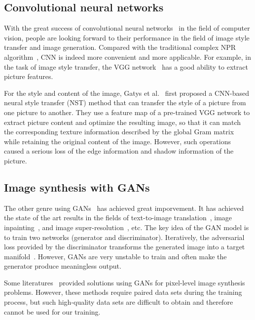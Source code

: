 \documentclass[10pt,twocolumn,letterpaper]{article}
\begin{document}
\subsection{Convolutional neural networks}
With the great success of convolutional neural networks~\cite{krizhevsky2012imagenet, lawrence1997face} in the field of
computer vision, people are looking forward to their performance in the
field of image style transfer and image generation. Compared with the
traditional complex NPR algorithm~\cite{saito1990comprehensible,luque2012cel}, CNN is indeed more convenient and more
applicable. For example, in the task of image style transfer, the VGG
network~\cite{VGG} has a good ability to extract picture features.

For the style and content of the image, Gatys et al.~\cite{NST} first proposed a
CNN-based neural style transfer (NST) method that can transfer the style
of a picture from one picture to another. They use a feature map of a
pre-trained VGG network to extract picture content and optimize the
resulting image, so that it can match the corresponding texture information
described by the global Gram matrix~\cite{gatys2015texture} while retaining the original content
of the image. However, such operations caused a serious loss of the edge
information and shadow information of the picture.

\subsection{Image synthesis with GANs}
The other genre using GANs~\cite{GAN} has achieved great imporvement. It has achieved
the state of the art results in the fields of text-to-image translation~\cite{reed2016generative}, image
inpainting~\cite{yeh2016semantic}, and image super-resolution~\cite{ledig2017photo}, etc. The key idea of the GAN model
is to train two networks (generator and discriminator). Iteratively,
the adversarial loss provided by the discriminator transforms the
generated image into a target manifold~\cite{yeh2016semantic}. However, GANs are very unstable to train and
often make the generator produce meaningless output.

Some literatures~\cite{dumoulin2016adversarially,isola2017image,karacan2016learning} provided solutions using GANs for pixel-level image
synthesis problems. However, these methods require paired data sets
during the training process, but such high-quality data sets are
difficult to obtain and therefore cannot be used for our training.
\end{document}
